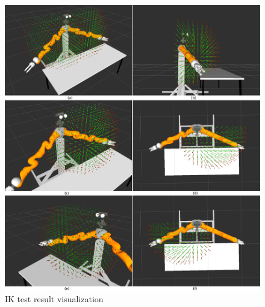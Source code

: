 \begin{figure}[p]
	\centering
  	\includegraphics[width=1.0\textwidth]{images/results.jpg}
	\caption{IK test result visualization}
	\label{fig:ik_visualization}
\end{figure}

